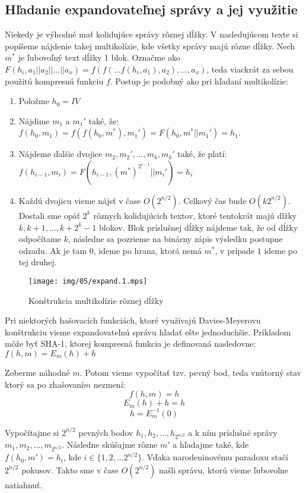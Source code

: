 \subsection{Hľadanie expandovateľnej správy a jej využitie}

Niekedy je výhodné mať kolidujúce správy rôznej dĺžky. 
V nasledujúcom texte si popíšeme nájdenie takej multikolízie,
kde všetky správy majú rôzne dĺžky. Nech $m^*$ je ľubovoľný
text dĺžky 1 blok.
Označme ako $F(h_i, a_1||a_2||\dots||a_x) = f(f(\dots f(h_i, a_1), a_2), \dots, a_x)$,
teda viackrát za sebou použitú kompresnú funkciu $f$.
Postup je podobný ako pri hľadaní multikolízie:
\begin{enumerate}
\itemsep -1.2mm
\item Položme $h_0 = IV$
\item Nájdime $m_1$ a $m_1'$ také, že: $f(h_0, m_1) = f(f(h_0, m^*), m_1') = F(h_0, m^*||m_1') = h_1$. 
\item Nájdeme ďalšie dvojice $m_2, m_2', \dots, m_k, m_k'$ také, že platí:
$f(h_{i-1}, m_i) = F(h_{i-1}, (m^*)^{2^{i-1}}||m_i') = h_i$
\item Každú dvojicu vieme nájsť v čase $O(2^{n/2})$. Celkový čas bude $O(k 2^{n/2})$.
Dostali sme opäť $2^k$ rôznych kolidujúcich textov, ktoré tentokrát 
majú dlžky $k, k+1, \dots, k+2^k-1$ blokov. 
Blok príslušnej dĺžky nájdeme tak, že od dĺžky odpočítame $k$, následne
sa pozrieme na binárny zápis výsledku postupne odzadu. Ak je tam $0$, ideme
po hrana, ktorá nemá $m^*$, v prípade $1$ ideme po tej druhej.
\end{enumerate}

\begin{figure}[h!]
    \centering
    \texttt{[image: img/05/expand.1.mps]}
    \caption{Konštrukcia multikolízie rôznej dĺžky}
    \label{fig:expand1}
\end{figure}


Pri niektorých hašovacích funkciách, ktoré využívajú
Davies-Meyerovu konštrukciu vieme expandovateľnú správu hľadať
ešte jednoduchšie. Príkladom môže byť SHA-1, ktorej kompresná funkcia
je definovaná nasledovne:
$f(h, m) = E_m(h)+h$

Zoberme náhodné $m$. Potom vieme vypočítať tzv. pevný bod, teda vnútorný
stav ktorý sa po \clqq zhašovaní\crqq $m$ nezmení:
$$f(h,m) = h$$
$$E_m(h) + h= h$$
$$h = E_m^{-1}(0)$$

Vypočítajme si $2^{n/2}$ pevných bodov $h_1, h_2, \dots, h_{2^{n/2}}$ a k ním príslušné správy
$m_1, m_2, \dots, m_{2^{n/2}}$. 
Následne skúšajme rôzne $m'$ a hľadajme také, kde $f(h_0, m') = h_i$, kde $i \in \{1, 2, \dots 2^{n/2}\}$.
Vďaka narodeninovému paradoxu stačí $2^{n/2}$ pokusov. Takto sme v čase $O(2^{n/2})$ našli správu, ktorú
vieme ľubovoľne natiahnuť.

